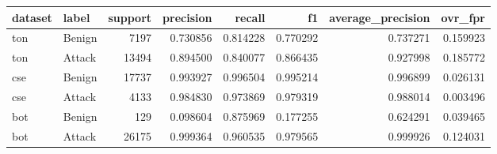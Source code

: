 \begin{tabular}{llrrrrrr}
\toprule
dataset & label & support & precision & recall & f1 & average\_precision & ovr\_fpr \\
\midrule
ton & Benign & 7197 & 0.730856 & 0.814228 & 0.770292 & 0.737271 & 0.159923 \\
ton & Attack & 13494 & 0.894500 & 0.840077 & 0.866435 & 0.927998 & 0.185772 \\
cse & Benign & 17737 & 0.993927 & 0.996504 & 0.995214 & 0.996899 & 0.026131 \\
cse & Attack & 4133 & 0.984830 & 0.973869 & 0.979319 & 0.988014 & 0.003496 \\
bot & Benign & 129 & 0.098604 & 0.875969 & 0.177255 & 0.624291 & 0.039465 \\
bot & Attack & 26175 & 0.999364 & 0.960535 & 0.979565 & 0.999926 & 0.124031 \\
\bottomrule
\end{tabular}
